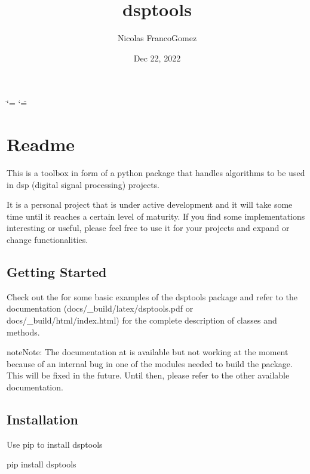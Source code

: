 \documentclass[letterpaper,10pt,english]{sphinxmanual}
\title{dsptools}
\date{Dec 22, 2022}
\author{Nicolas Franco\sphinxhyphen{}Gomez}
\begin{document}
\ifdefined\shorthandoff
  \ifnum\catcode`\=\string=\active\shorthandoff{=}\fi
  \ifnum\catcode`\"=\active{}\fi
\fi

\pagestyle{empty}
\sphinxmaketitle
\pagestyle{plain}
\sphinxtableofcontents
\pagestyle{normal}
\label{\detokenize{index::doc}}


\sphinxstepscope


\chapter{Readme}
\label{\detokenize{readme:readme}}\label{\detokenize{readme::doc}}
\sphinxAtStartPar
This is a toolbox in form of a python package that handles algorithms to be used in dsp (digital signal processing) projects.

\sphinxAtStartPar
It is a personal project that is under active development and it will take some time until it reaches a certain level of maturity.
If you find some implementations interesting or useful, please feel free to use it for your projects and expand or change
functionalities.


\section{Getting Started}
\label{\detokenize{readme:getting-started}}
\sphinxAtStartPar
Check out the  for some basic examples of the dsptools package
and refer to the documentation (docs/\_build/latex/dsptools.pdf or docs/\_build/html/index.html)
for the complete description of classes and methods.

\begin{sphinxadmonition}{note}{Note:}
\sphinxAtStartPar
The documentation at  is available but not working at the moment because of
an internal bug in one of the modules needed to build the package. This will be fixed in the future.
Until then, please refer to the other available documentation.
\end{sphinxadmonition}


\section{Installation}
\label{\detokenize{readme:installation}}
\sphinxAtStartPar
Use pip to install dsptools

\begin{sphinxVerbatim}[commandchars=\\\{\}]
pip install dsptools
\end{sphinxVerbatim}
\end{document}
